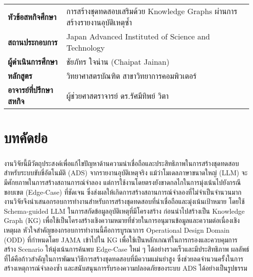 \documentclass[a4paper,12pt]{report}
\begin{document}
{
\cleardoublepage%
\let\clearpage\relax%
\noindent
\begin{tabular}{l p{10cm}}
    \textbf{หัวข้อสหกิจศึกษา} & การสร้างชุดทดสอบเสริมด้วย Knowledge Graphs ผ่านการสร้างรายงานอุบัติเหตุซ้ำ \vspace{0.2cm} \\
    \textbf{สถานประกอบการ} & Japan Advanced Instituted of Science and Technology \vspace{0.2cm}\\
    \textbf{ผู้ดำเนินการศึกษา} & ชัยภัทร ใจน่าน (Chaipat Jainan) \vspace{0.2cm}\\
    \textbf{หลักสูตร} & วิทยาศาสตรบัณฑิต สาขาวิทยาการคอมพิวเตอร์ \vspace{0.2cm}\\
    \textbf{อาจารย์ที่ปรึกษาสหกิจ} & ผู้ช่วยศาสตราจารย์ ดร.รัศมีทิพย์ วิตา \vspace{0.2cm}\\
\end{tabular}

\chapter*{บทคัดย่อ}

\paragraph{}
งานวิจัยนี้มีวัตถุประสงค์เพื่อแก้ไขปัญหาด้านความน่าเชื่อถือและประสิทธิภาพในการสร้างชุดทดสอบสำหรับระบบขับขี่อัตโนมัติ (ADS) จากรายงานอุบัติเหตุจริง แม้ว่าโมเดลภาษาขนาดใหญ่ (LLM) จะมีศักยภาพในการสร้างสถานการณ์จำลอง แต่การใช้งานโดยตรงยังขาดกลไกในการมุ่งเน้นไปยังกรณีขอบเขต (Edge-Case) ที่ชัดเจน ซึ่งส่งผลให้เกิดการสร้างสถานการณ์จำลองที่ไม่จำเป็นจำนวนมาก งานวิจัยจึงนำเสนอกรอบการทำงานสำหรับการสร้างชุดทดสอบที่น่าเชื่อถือและมุ่งเน้นเป้าหมาย โดยใช้ Schema-guided LLM ในการสกัดข้อมูลอุบัติเหตุที่มีโครงสร้าง ก่อนนำไปสร้างเป็น Knowledge Graph (KG) เพื่อใช้เป็นโครงสร้างเชิงความหมายที่ช่วยในการอนุมานข้อมูลและความต่อเนื่องเชิงเหตุผล หัวใจสำคัญของกรอบการทำงานนี้คือการบูรณาการ Operational Design Domain (ODD) ที่กำหนดโดย JAMA เข้าไปใน KG เพื่อใช้เป็นหลักเกณฑ์ในการกรองและควบคุมการสร้าง Scenario ให้มุ่งเน้นการค้นพบ Edge-Case ใหม่ ๆ ได้อย่างรวดเร็วและมีประสิทธิภาพ ผลลัพธ์ที่ได้คือก้าวสำคัญในการพัฒนาวิธีการสร้างชุดทดสอบที่มีความแม่นยำสูง ซึ่งช่วยลดจำนวนครั้งในการสร้างเหตุการณ์จำลองซ้ำ และสนับสนุนการรับรองความปลอดภัยของระบบ ADS ได้อย่างเป็นรูปธรรม
}
\end{document}
